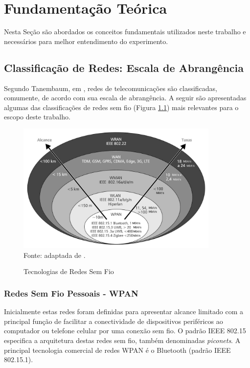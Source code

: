 \chapter{Fundamentação Teórica}
\label{fundamentacao}
Nesta Seção são abordados os conceitos fundamentais utilizados neste trabalho e necessários para melhor entendimento do experimento.

\section{Classificação de Redes: Escala de Abrangência}
\label{classRedes}
Segundo Tanembaum, em \cite{tanembaum2011}, redes de telecomunicações são classificadas, comumente, de acordo com sua escala de abrangência. A seguir são apresentadas algumas das classificações de redes sem fio (Figura \ref{fig:tecnologias_redes_semfiof}) mais relevantes para o escopo deste trabalho.

\begin{figure}[ht]
	\begin{center}
		\caption{Tecnologias de Redes Sem Fio}
		\includegraphics[width=10cm]{./sections/textual/chapters/images/tecnologias_redes_semfio.png}\\
		Fonte: adaptada de \cite{rochol2018sistemas}.
		\label{fig:tecnologias_redes_semfiof}
	\end{center}
\end{figure}

\subsection{Redes Sem Fio Pessoais - WPAN}
Inicialmente estas redes foram definidas para apresentar alcance limitado com a principal função de facilitar a conectividade de dispositivos periféricos ao computador ou telefone celular por uma conexão sem fio. O padrão IEEE 802.15 especifica a arquitetura destas redes sem fio, também denominadas \emph{piconets}. A principal  tecnologia comercial de redes WPAN é o Bluetooth (padrão IEEE 802.15.1).

